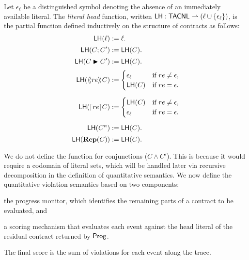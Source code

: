 \begin{definition}

    Let $\epsilon_\ell$ be a distinguished symbol denoting the absence of an immediately available literal.
    The \emph{literal head} function, written
    $
      \LH : \cDL \rightharpoonup (\ell \cup \{\epsilon_\ell\})
    $,
    is the partial function defined inductively on the structure of contracts as follows:
    \[
    \begin{aligned}
    \LH(\ell) &:= \ell. \\[2pt]
    \LH(C ; C') &:= \LH(C). \\[2pt]
    \LH(C \repair C') &:= \LH(C). \\[2pt]
    \LH(\trig[re]{C}) &:= 
    \begin{cases}
    \epsilon_\ell & \text{if } re \neq \epsilon,\\
    \LH(C) & \text{if } re = \epsilon.
    \end{cases} \\[6pt]
    \LH(\guard[re]{C}) &:= 
    \begin{cases}
    \LH(C) & \text{if } re \neq \epsilon,\\
    \epsilon_\ell & \text{if } re = \epsilon.
    \end{cases} \\[6pt]
    \LH(C^n) &:= \LH(C). \\[2pt]
    \LH(\repit{C}) &:= \LH(C).
    \end{aligned}
    \]
    \end{definition}
    We do not define the function for conjunctions ($C \wedge C'$). This is because it would require a codomain of literal sets, which will be handled later via recursive decomposition in the definition of quantitative semantics.
    We now define the quantitative violation semantics based on two components: \begin{inparaenum} \item the progress monitor, which identifies the remaining parts of a contract to be evaluated, and \item a scoring mechanism that evaluates each event against the head literal of the residual contract returned by $\Prog$. \end{inparaenum} The final score is the sum of violations for each event along the trace.

